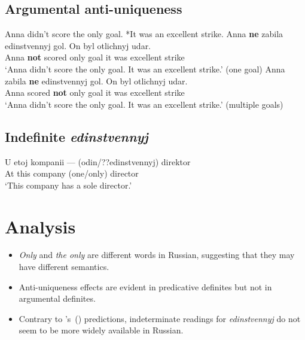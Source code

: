 \documentclass{article}
\newcommand{\citegen}[1]{\citeauthor{#1}'s~(\citeyear{#1})}
\begin{document}
\subsection*{Argumental anti-uniqueness}
\begin{exe}
	\ex Anna didn't score the only goal. *It was an excellent strike.
	\ex \gll Anna \textbf{ne} zabila edinstvennyj gol. On byl otlichnyj udar.\\
	Anna \textbf{not} scored only goal it was excellent strike\\
	\glt `Anna didn't score the only goal. It was an excellent strike.' (one goal)
	\ex \gll Anna zabila \textbf{ne} edinstvennyj gol. On byl otlichnyj udar.\\
	Anna scored \textbf{not} only goal it was excellent strike\\
	\glt `Anna didn't score the only goal. It was an excellent strike.' (multiple goals)
\end{exe}

\subsection*{Indefinite \textit{edinstvennyj}}
\begin{exe}
	\ex \gll U etoj kompanii --- (odin/??edinstvennyj) direktor\\
	At this company {} (one/only) director\\
	\glt `This company has a sole director.'
\end{exe}

\section{Analysis}
\begin{itemize}
	\item \textit{Only} and \textit{the only} are different words in Russian, suggesting that they may have different semantics.
	\item Anti-uniqueness effects are evident in predicative definites but not in argumental definites.
	\item Contrary to \citegen{cb2015} predictions, indeterminate readings for \textit{edinstvennyj} do not seem to be more widely available in Russian.
\end{itemize}
\end{document}
